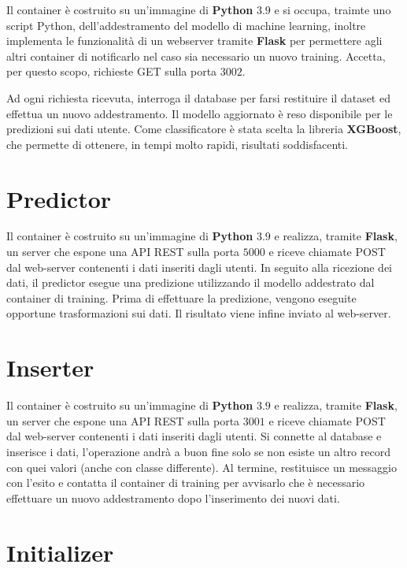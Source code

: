 \documentclass[12pt,a4paper]{report}
\begin{document}
Il container è costruito su un'immagine di \textbf{Python} $3.9$
e si occupa, traimte uno script Python, dell'addestramento
del modello di machine learning,
inoltre implementa le funzionalità di un webserver
tramite \textbf{Flask} per permettere
agli altri container di notificarlo
nel caso sia necessario un nuovo training.
Accetta, per questo scopo, richieste GET sulla porta $3002$.

Ad ogni richiesta ricevuta,
interroga il database per farsi restituire
il dataset ed effettua un nuovo addestramento.
Il modello aggiornato è reso disponibile per le predizioni sui dati utente.
Come classificatore è stata scelta la libreria \textbf{XGBoost},
che permette di ottenere, in tempi molto rapidi, risultati soddisfacenti.

\section{Predictor}

Il container è costruito su un'immagine di \textbf{Python} $3.9$
e realizza, tramite \textbf{Flask}, un server
che espone una API REST sulla porta $5000$
e riceve chiamate POST dal web-server contenenti i dati inseriti
dagli utenti.
In seguito alla ricezione dei dati, il predictor esegue una
predizione utilizzando il modello addestrato dal container di training.
Prima di effettuare la predizione, vengono eseguite
opportune trasformazioni sui dati.
Il risultato viene infine inviato al web-server.

\section{Inserter}

Il container è costruito su un'immagine di \textbf{Python} $3.9$
e realizza, tramite \textbf{Flask}, un server
che espone una API REST sulla porta $3001$
e riceve chiamate POST dal web-server contenenti i dati inseriti
dagli utenti.
Si connette al database e inserisce i dati,
l'operazione andrà a buon fine solo
se non esiste un altro record con quei valori
(anche con classe differente).
Al termine, restituisce un messaggio
con l'esito e contatta il container di training per avvisarlo
che è necessario effettuare un nuovo addestramento dopo
l'inserimento dei nuovi dati.

\section{Initializer}
\end{document}
